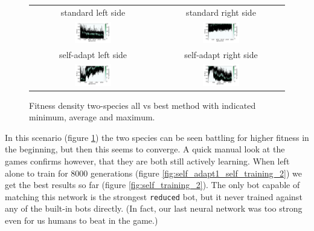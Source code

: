 \documentclass[11pt,a4paper]{scrartcl}
\begin{document}
\begin{figure}[H]
\center
\begin{tabular}{cc}
standard left side & standard right side \\
\includegraphics[width=0.3\textwidth]{img/standard_self_training_2_1.png} &
\includegraphics[width=0.3\textwidth]{img/standard_self_training_2_2.png} \\
self-adapt left side & self-adapt right side \\
\includegraphics[width=0.3\textwidth]{img/self_adapt_1_self_training_2_1_oldrun.png} &
\includegraphics[width=0.3\textwidth]{img/self_adapt_1_self_training_2_2_oldrun.png}
\end{tabular}
\caption{Fitness density two-species all vs best method with indicated minimum, average and maximum.}
\label{fig:self_adapt_1_self_training_2_oldrun}
\end{figure}

In this scenario (figure \ref{fig:self_adapt_1_self_training_2_oldrun}) the two species can be seen battling for higher fitness in the beginning, but then this seems to converge. A quick manual look at the games confirms however, that they are both still actively learning. When left alone to train for 8000 generations (figure \ref{fig:self_adapt1_self_training_2}) we get the best results so far (figure \ref{fig:self_training_2}). The only bot capable of matching this network is the strongest \texttt{reduced} bot, but it never trained against any of the built-in bots directly. (In fact, our last neural network was too strong even for us humans to beat in the game.)
\end{document}
